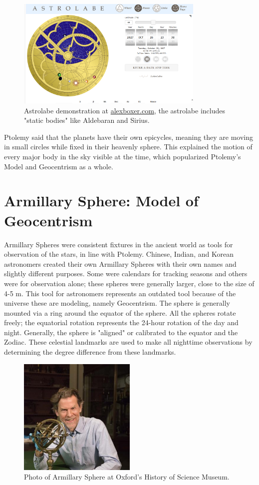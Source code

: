 \documentclass[12pt,oneside,a4paper,english]{article}
\begin{document}
\begin{figure}[H]
\centering
\includegraphics[width=0.8\textwidth]{Astrolaabe1.png}
\caption{Astrolabe demonstration at \href{https://alexboxer.com/astrolabe/}{alexboxer.com}, the astrolabe includes "static bodies" like Aldebaran and Sirius.}
\label{fig:astrolabe}
\end{figure}

Ptolemy said that the planets have their own epicycles, meaning they are moving in small circles while fixed in their heavenly sphere. This explained the motion of every major body in the sky visible at the time, which popularized Ptolemy's Model and Geocentrism as a whole.
\section{Armillary Sphere: Model of Geocentrism}
Armillary Spheres were consistent fixtures in the ancient world as tools for observation of the stars, in line with Ptolemy. Chinese, Indian, and Korean astronomers created their own Armillary Spheres with their own names and slightly different purposes. Some were calendars for tracking seasons and others were for observation alone; these spheres were generally larger, close to the size of 4-5 m. This tool for astronomers represents an outdated tool because of the universe these are modeling, namely Geocentrism. The sphere is generally mounted via a ring around the equator of the sphere. All the spheres rotate freely; the equatorial rotation represents the 24-hour rotation of the day and night. Generally, the sphere is "aligned" or calibrated to the equator and the Zodiac. These celestial landmarks are used to make all nighttime observations by determining the degree difference from these landmarks.
\begin{figure}[H]
\centering
\includegraphics[width=0.5\textwidth]{Sphere1.jpg}
\caption{Photo of Armillary Sphere at Oxford's History of Science Museum.\cite{sphere}}
\label{fig:sphere}
\end{figure}
\end{document}
